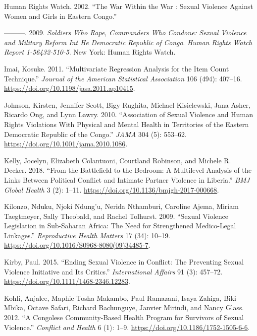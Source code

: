 \documentclass[
]{article}
\newlength{\cslhangindent}
\newenvironment{CSLReferences}[2] %
 {\begin{list}{}{%
  \setlength{\itemindent}{0pt}
  \setlength{\leftmargin}{0pt}
  \setlength{\parsep}{0pt}
  \ifodd #1
   \setlength{\leftmargin}{\cslhangindent}
   \setlength{\itemindent}{-1\cslhangindent}
  \fi
  \setlength{\itemsep}{#2\baselineskip}}}
 {\end{list}}
\begin{document}
\begin{CSLReferences}{1}{0}
Human Rights Watch. 2002. {``The War Within the War : Sexual Violence
Against Women and Girls in {Eastern Congo}.''}

---------. 2009. \emph{Soldiers Who Rape, Commanders Who Condone:
{Sexual} Violence and Military Reform Int He {Democratic Republic} of
{Congo}}. \emph{Human Rights Watch Report 1-56432-510-5}. {New York}:
{Human Rights Watch}.

Imai, Kosuke. 2011. {``Multivariate Regression Analysis for the Item
Count Technique.''} \emph{Journal of the American Statistical
Association} 106 (494): 407--16.
\url{https://doi.org/10.1198/jasa.2011.ap10415}.

Johnson, Kirsten, Jennifer Scott, Bigy Rughita, Michael Kisielewski,
Jana Asher, Ricardo Ong, and Lynn Lawry. 2010. {``Association of {Sexual
Violence} and {Human Rights Violations With Physical} and {Mental
Health} in {Territories} of the {Eastern Democratic Republic} of the
{Congo}.''} \emph{JAMA} 304 (5): 553--62.
\url{https://doi.org/10.1001/jama.2010.1086}.

Kelly, Jocelyn, Elizabeth Colantuoni, Courtland Robinson, and Michele R.
Decker. 2018. {``From the Battlefield to the Bedroom: {A} Multilevel
Analysis of the Links Between Political Conflict and Intimate Partner
Violence in {Liberia}.''} \emph{BMJ Global Health} 3 (2): 1--11.
\url{https://doi.org/10.1136/bmjgh-2017-000668}.

Kilonzo, Nduku, Njoki Ndung'u, Nerida Nthamburi, Caroline Ajema, Miriam
Taegtmeyer, Sally Theobald, and Rachel Tolhurst. 2009. {``Sexual
Violence Legislation in Sub-{Saharan Africa}: The Need for Strengthened
Medico-Legal Linkages.''} \emph{Reproductive Health Matters} 17 (34):
10--19. \url{https://doi.org/10.1016/S0968-8080(09)34485-7}.

Kirby, Paul. 2015. {``Ending Sexual Violence in Conflict: {The
Preventing Sexual Violence Initiative} and Its Critics.''}
\emph{International Affairs} 91 (3): 457--72.
\url{https://doi.org/10.1111/1468-2346.12283}.

Kohli, Anjalee, Maphie Tosha Makambo, Paul Ramazani, Isaya Zahiga, Biki
Mbika, Octave Safari, Richard Bachunguye, Janvier Mirindi, and Nancy
Glass. 2012. {``A {Congolese} Community-Based Health Program for
Survivors of Sexual Violence.''} \emph{Conflict and Health} 6 (1): 1--9.
\url{https://doi.org/10.1186/1752-1505-6-6}.


\end{CSLReferences}
\end{document}

